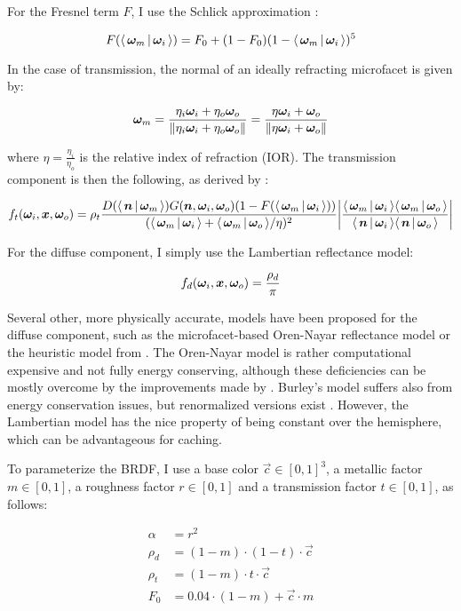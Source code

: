 For the Fresnel term $F$, I use the Schlick approximation :

\begin{equation}
    F(\LdotH) = F_0 + (1 - F_0) (1 - \LdotH)^5
\end{equation}

In the case of transmission, the normal of an ideally refracting microfacet is given by:

\begin{equation}
    \bm{\omega}_m = \frac{\eta_i \bm{\omega}_i + \eta_o \bm{\omega}_o}{\|\eta_i \bm{\omega}_i + \eta_o \bm{\omega}_o\|} =\frac{\eta \bm{\omega}_i + \bm{\omega}_o}{\|\eta \bm{\omega}_i + \bm{\omega}_o\|}
\end{equation}

where $\eta = \frac{\eta_i}{\eta_o}$ is the relative index of refraction (IOR).
The transmission component is then the following, as derived by \textcite{walter2007}:

\begin{equation}
    f_t(\wi, \vec{x}, \wo) = \rho_t \frac{D(\NdotH) G(\n, \wi, \wo) (1 - F(\LdotH))}{(\LdotH + \VdotH / \eta)^2} \left|\frac{\LdotH \VdotH}{\NdotL \NdotV}\right|
\end{equation}

For the diffuse component, I simply use the Lambertian reflectance model:

\begin{equation}
    f_d(\bm{\omega}_i, \bm{x}, \bm{\omega}_o) = \frac{\rho_d}{\pi}
\end{equation}

Several other, more physically accurate, models have been proposed for the diffuse component, such as the microfacet-based Oren-Nayar reflectance model  or the heuristic model from \textcite{burley2012}.
The Oren-Nayar model is rather computational expensive and not fully energy conserving, although these deficiencies can be mostly overcome by the improvements made by \textcite{fujii}.
Burley's model suffers also from energy conservation issues, but renormalized versions exist .
However, the Lambertian model has the nice property of being constant over the hemisphere, which can be advantageous for caching.

To parameterize the BRDF, I use a base color $\vec{c} \in [0, 1]^3$, a metallic factor $m \in [0, 1]$, a roughness factor $r \in [0, 1]$ and a transmission factor $t \in [0, 1]$, as follows:

\begin{equation}
    \begin{aligned}
        \alpha &= r^2 \\
        \rho_d &= (1 - m) \cdot (1 - t) \cdot \vec{c} \\
        \rho_t &= (1 - m) \cdot t \cdot \vec{c} \\
        F_0 &= 0.04 \cdot (1 - m) + \vec{c} \cdot m \\
    \end{aligned}
\end{equation}

